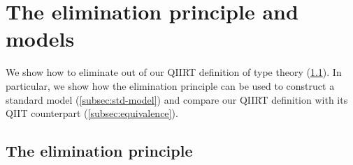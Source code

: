 \documentclass[a4paper,UKenglish,numberwithinsect,cleveref,thm-restate]{lipics-v2021}
\newcommand{\LT}[2][]{\todo[inline,author={L-T},caption={},color={pink},#1]{#2}}
\begin{document}

\section{The elimination principle and models} \label{sec:models}

We show how to eliminate out of our QIIRT definition of type theory (\cref{subsec:eliminator}). In particular, we show how the elimination principle can be used to construct a standard model (\cref{subsec:std-model}) and compare our QIIRT definition with its QIIT counterpart (\cref{subsec:equivalence}).

\subsection{The elimination principle} \label{subsec:eliminator}
\end{document}
